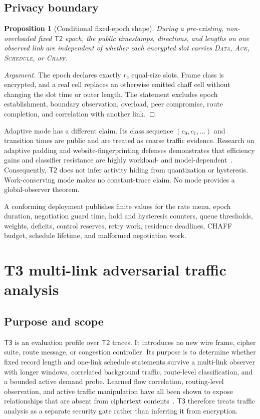 \documentclass[11pt,oneside]{article}
\newcommand{\Ttwo}{\ensuremath{\mathsf{T2}}}
\newcommand{\Tthree}{\ensuremath{\mathsf{T3}}}
\newtheorem{proposition}{Proposition}
\begin{document}
\subsection{Privacy boundary}

\begin{proposition}[Conditional fixed-epoch shape]
During a pre-existing, non-overloaded fixed \Ttwo{} epoch, the public timestamps, directions, and lengths on one observed link are independent of whether each encrypted slot carries \textsc{Data}, \textsc{Ack}, \textsc{Schedule}, or \textsc{Chaff}.
\end{proposition}

\begin{proof}[Argument]
The epoch declares exactly $r_c$ equal-size slots. Frame class is encrypted, and a real cell replaces an otherwise emitted chaff cell without changing the slot time or outer length. The statement excludes epoch establishment, boundary observation, overload, peer compromise, route completion, and correlation with another link.
\end{proof}

Adaptive mode has a different claim. Its class sequence $(c_0,c_1,\ldots)$ and transition times are public and are treated as coarse traffic evidence. Research on adaptive padding and website-fingerprinting defenses demonstrates that efficiency gains and classifier resistance are highly workload- and model-dependent~\cite{wtfpad}. Consequently, \Ttwo{} does not infer activity hiding from quantization or hysteresis. Work-conserving mode makes no constant-trace claim. No mode provides a global-observer theorem.

A conforming deployment publishes finite values for the rate menu, epoch duration, negotiation guard time, hold and hysteresis counters, queue thresholds, weights, deficits, control reserves, retry work, residence deadlines, CHAFF budget, schedule lifetime, and malformed negotiation work.



\section{T3 multi-link adversarial traffic analysis}
\label{sec:t3}

\subsection{Purpose and scope}

\Tthree{} is an evaluation profile over \Ttwo{} traces. It introduces no new wire frame, cipher suite, route message, or congestion controller. Its purpose is to determine whether fixed record length and one-link schedule statements survive a multi-link observer with longer windows, correlated background traffic, route-level classification, and a bounded active demand probe. Learned flow correlation, routing-level observation, and active traffic manipulation have all been shown to expose relationships that are absent from ciphertext contents~\cite{deepcorr,raptor,dropmark,duster}. \Tthree{} therefore treats traffic analysis as a separate security gate rather than inferring it from encryption.
\end{document}
